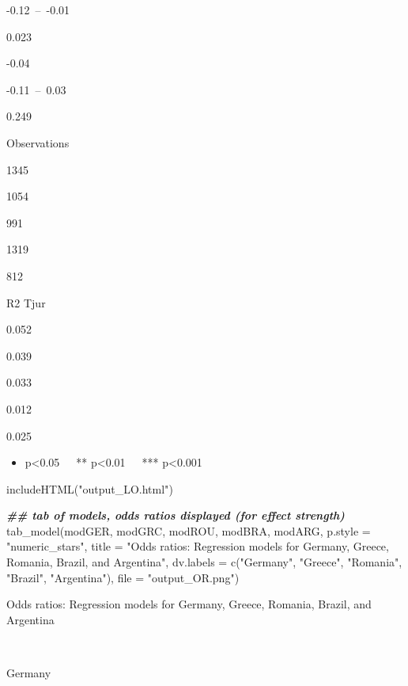 \documentclass[
  12pt,
  english,
]{article}
\newenvironment{Shaded}{\begin{snugshade}}{\end{snugshade}}
\newcommand{\AttributeTok}[1]{\textcolor[rgb]{0.77,0.63,0.00}{#1}}
\newcommand{\DocumentationTok}[1]{\textcolor[rgb]{0.56,0.35,0.01}{\textbf{\textit{#1}}}}
\newcommand{\FunctionTok}[1]{\textcolor[rgb]{0.00,0.00,0.00}{#1}}
\newcommand{\NormalTok}[1]{#1}
\newcommand{\StringTok}[1]{\textcolor[rgb]{0.31,0.60,0.02}{#1}}
\providecommand{\tightlist}{%
  \setlength{\itemsep}{0pt}\setlength{\parskip}{0pt}}
\begin{document}
-0.12~--~-0.01

0.023

-0.04

-0.11~--~0.03

0.249

Observations

1345

1054

991

1319

812

R2 Tjur

0.052

0.039

0.033

0.012

0.025

\begin{itemize}
\tightlist
\item
  p\textless0.05~~~** p\textless0.01~~~*** p\textless0.001
\end{itemize}

\begin{Shaded}
\begin{Highlighting}[]
\FunctionTok{includeHTML}\NormalTok{(}\StringTok{"output\_LO.html"}\NormalTok{)}
\end{Highlighting}
\end{Shaded}

\begin{Shaded}
\begin{Highlighting}[]
\DocumentationTok{\#\# tab of models, odds ratios displayed (for effect strength)}
\FunctionTok{tab\_model}\NormalTok{(modGER, modGRC, modROU, modBRA, modARG, }\AttributeTok{p.style =} \StringTok{"numeric\_stars"}\NormalTok{,}
                     \AttributeTok{title =} \StringTok{"Odds ratios: Regression models for Germany, Greece, Romania, Brazil, and Argentina"}\NormalTok{,}
                     \AttributeTok{dv.labels =} \FunctionTok{c}\NormalTok{(}\StringTok{"Germany"}\NormalTok{, }\StringTok{"Greece"}\NormalTok{, }\StringTok{"Romania"}\NormalTok{, }\StringTok{"Brazil"}\NormalTok{, }\StringTok{"Argentina"}\NormalTok{),}
                    \AttributeTok{file =} \StringTok{"output\_OR.png"}\NormalTok{)}
\end{Highlighting}
\end{Shaded}

Odds ratios: Regression models for Germany, Greece, Romania, Brazil, and
Argentina

~

Germany
\end{document}

